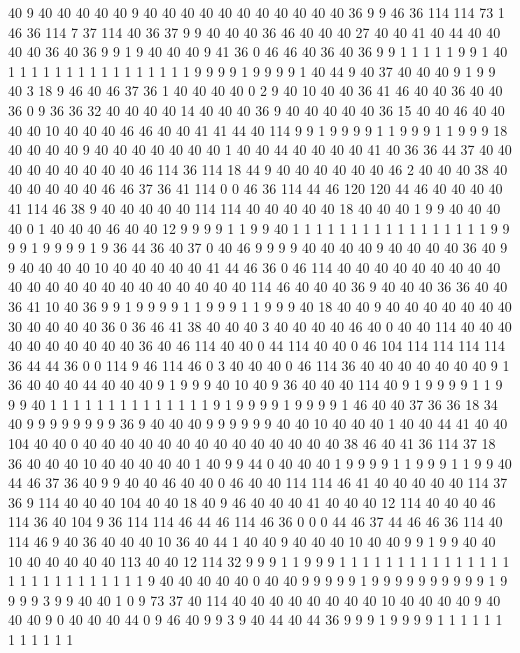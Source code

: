 40 9 40 40 40 40 40 9 40 40 40 40 40 40 40 40 40 40 40 36
9 9 46 36 114 114 73 1 46 36 114 7 37 114 40 36 37 9 9 40
40 40 36 46 40 40 40 27 40 40 41 40 44 40 40 40 40 36 40 36
9 9 1 9 40 40 40 9 41 36 0 46 46 40 36 40 36 9 9 1
1 1 1 1 9 9 1 40 1 1 1 1 1 1 1 1 1 1 1 1
1 1 1 1 9 9 9 9 1 9 9 9 9 1 40 44 9 40 37 40
40 40 9 1 9 9 40 3 18 9 46 40 46 37 36 1 40 40 40 40
0 2 9 40 10 40 40 36 41 46 40 40 36 40 40 36 0 9 36 36
32 40 40 40 40 14 40 40 40 36 9 40 40 40 40 40 36 15 40 40
46 40 40 40 40 10 40 40 40 46 46 40 40 41 41 44 40 114 9 9
1 9 9 9 9 1 1 9 9 9 1 1 9 9 9 18 40 40 40 40
9 40 40 40 40 40 40 40 1 40 40 44 40 40 40 40 41 40 36 36
44 37 40 40 40 40 40 40 40 40 40 46 114 36 114 18 44 9 40 40
40 40 40 40 46 2 40 40 40 38 40 40 40 40 40 40 46 46 37 36
41 114 0 0 46 36 114 44 46 120 120 44 46 40 40 40 40 41 114 46
38 9 40 40 40 40 40 114 114 40 40 40 40 40 18 40 40 40 1 9
9 40 40 40 40 0 1 40 40 40 46 40 40 12 9 9 9 9 1 1
9 9 40 1 1 1 1 1 1 1 1 1 1 1 1 1 1 1 1 1
9 9 9 9 1 9 9 9 9 1 9 36 44 36 40 37 0 40 46 9
9 9 9 40 40 40 40 9 40 40 40 40 36 40 9 9 40 40 40 40
10 40 40 40 40 40 41 44 46 36 0 46 114 40 40 40 40 40 40 40
40 40 40 40 40 40 40 40 40 40 40 40 40 40 40 114 46 40 40 40
36 9 40 40 40 36 36 40 40 36 41 10 40 36 9 9 1 9 9 9
9 1 1 9 9 9 1 1 9 9 9 40 18 40 40 9 40 40 40 40
40 40 40 30 40 40 40 40 36 0 36 46 41 38 40 40 40 3 40 40
40 40 46 40 0 40 40 114 40 40 40 40 40 40 40 40 40 40 36 40
46 114 40 40 0 44 114 40 40 0 46 104 114 114 114 114 36 44 44 36
0 0 114 9 46 114 46 0 3 40 40 40 0 46 114 36 40 40 40 40
40 40 40 9 1 36 40 40 40 44 40 40 40 9 1 9 9 9 40 10
40 9 36 40 40 40 114 40 9 1 9 9 9 9 1 1 9 9 9 40
1 1 1 1 1 1 1 1 1 1 1 1 1 1 9 1 9 9 9 9
1 9 9 9 9 1 46 40 40 37 36 36 18 34 40 9 9 9 9 9
9 9 9 36 9 40 40 40 9 9 9 9 9 9 40 40 10 40 40 40
1 40 40 44 41 40 40 104 40 40 0 40 40 40 40 40 40 40 40 40
40 40 40 40 40 38 46 40 41 36 114 37 18 36 40 40 40 10 40 40
40 40 40 1 40 9 9 44 0 40 40 40 1 9 9 9 9 1 1 9
9 9 1 1 9 9 40 44 46 37 36 40 9 9 40 40 46 40 40 0
46 40 40 114 114 46 41 40 40 40 40 40 114 37 36 9 114 40 40 40
104 40 40 18 40 9 46 40 40 40 41 40 40 40 12 114 40 40 40 46
114 36 40 104 9 36 114 114 46 44 46 114 46 36 0 0 0 44 46 37
44 46 46 36 114 40 114 46 9 40 36 40 40 40 10 36 40 44 1 40
40 9 40 40 40 10 40 40 9 9 1 9 9 40 40 10 40 40 40 40
40 113 40 40 12 114 32 9 9 9 1 1 9 9 9 1 1 1 1 1
1 1 1 1 1 1 1 1 1 1 1 1 1 1 1 1 1 1 1 1
1 1 9 40 40 40 40 40 0 40 40 9 9 9 9 9 1 9 9 9
9 9 9 9 9 9 9 1 9 9 9 9 3 9 9 40 40 1 0 9
73 37 40 114 40 40 40 40 40 40 40 40 10 40 40 40 40 9 40 40
40 9 0 40 40 40 44 0 9 46 40 9 9 3 9 40 44 40 44 36
9 9 9 1 9 9 9 9 1 1 1 1 1 1 1 1 1 1 1 1
